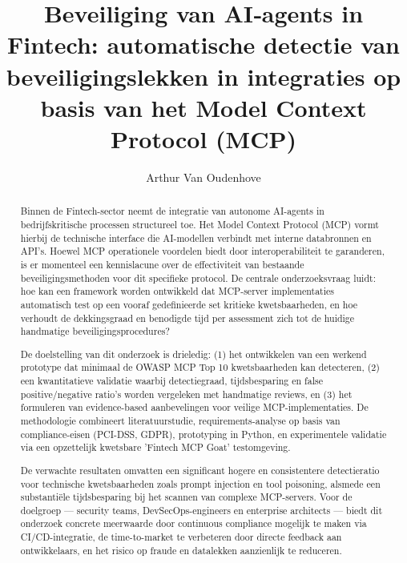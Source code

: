 \documentclass{hogent-article}
\title{Beveiliging van AI‑agents in Fintech: automatische detectie van beveiligingslekken in integraties op basis van het Model Context Protocol (MCP)}
\author{Arthur Van Oudenhove}
\begin{document}

\begin{abstract}
    Binnen de Fintech-sector neemt de integratie van autonome AI-agents in bedrijfskritische processen structureel toe. Het Model Context Protocol (MCP) vormt hierbij de technische interface die AI-modellen verbindt met interne databronnen en API's. Hoewel MCP operationele voordelen biedt door interoperabiliteit te garanderen, is er momenteel een kennislacune over de effectiviteit van bestaande beveiligingsmethoden voor dit specifieke protocol. De centrale onderzoeksvraag luidt: hoe kan een framework worden ontwikkeld dat MCP-server implementaties automatisch test op een vooraf gedefinieerde set kritieke kwetsbaarheden, en hoe verhoudt de dekkingsgraad en benodigde tijd per assessment zich tot de huidige handmatige beveiligingsprocedures?
    
    De doelstelling van dit onderzoek is drieledig: (1) het ontwikkelen van een werkend prototype dat minimaal de OWASP MCP Top 10 kwetsbaarheden kan detecteren, (2) een kwantitatieve validatie waarbij detectiegraad, tijdsbesparing en false positive/negative ratio's worden vergeleken met handmatige reviews, en (3) het formuleren van evidence-based aanbevelingen voor veilige MCP-implementaties. De methodologie combineert literatuurstudie, requirements-analyse op basis van compliance-eisen (PCI-DSS, GDPR), prototyping in Python, en experimentele validatie via een opzettelijk kwetsbare 'Fintech MCP Goat' testomgeving.
    
    De verwachte resultaten omvatten een significant hogere en consistentere detectieratio voor technische kwetsbaarheden zoals prompt injection en tool poisoning, alsmede een substantiële tijdsbesparing bij het scannen van complexe MCP-servers. Voor de doelgroep — security teams, DevSecOps-engineers en enterprise architects — biedt dit onderzoek concrete meerwaarde door continuous compliance mogelijk te maken via CI/CD-integratie, de time-to-market te verbeteren door directe feedback aan ontwikkelaars, en het risico op fraude en datalekken aanzienlijk te reduceren.
\end{abstract}

\tableofcontents



\FloatBarrier 

\begingroup
\printbibliography[heading=bibintoc]
\endgroup
\end{document}
